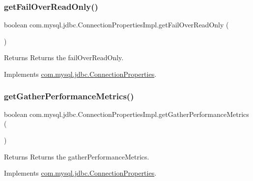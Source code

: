 \subsubsection{\texorpdfstring{get\+Fail\+Over\+Read\+Only()}{getFailOverReadOnly()}}
{\footnotesize\ttfamily boolean com.\+mysql.\+jdbc.\+Connection\+Properties\+Impl.\+get\+Fail\+Over\+Read\+Only (\begin{DoxyParamCaption}{ }\end{DoxyParamCaption})}

\begin{DoxyReturn}{Returns}
Returns the fail\+Over\+Read\+Only. 
\end{DoxyReturn}


Implements \mbox{\hyperlink{interfacecom_1_1mysql_1_1jdbc_1_1_connection_properties_a14f395dcf2b5c008aef09513895925f7}{com.\+mysql.\+jdbc.\+Connection\+Properties}}.

\mbox{\label{classcom_1_1mysql_1_1jdbc_1_1_connection_properties_impl_a2e0086f3bd63c1bc9e7e6457ed41c996}} 
\subsubsection{\texorpdfstring{get\+Gather\+Performance\+Metrics()}{getGatherPerformanceMetrics()}}
{\footnotesize\ttfamily boolean com.\+mysql.\+jdbc.\+Connection\+Properties\+Impl.\+get\+Gather\+Performance\+Metrics (\begin{DoxyParamCaption}{ }\end{DoxyParamCaption})}

\begin{DoxyReturn}{Returns}
Returns the gather\+Performance\+Metrics. 
\end{DoxyReturn}


Implements \mbox{\hyperlink{interfacecom_1_1mysql_1_1jdbc_1_1_connection_properties_a90f58aa61c84d2072ba37c902aef8f9e}{com.\+mysql.\+jdbc.\+Connection\+Properties}}.

